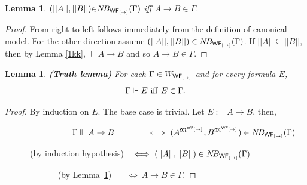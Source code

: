 \documentclass[12pt]{article}
\newtheorem{lem}[thm]{Lemma}
\begin{document}
\begin{lem}
\label{xxxx}
$( ||  A||  , ||  B ||  ) {\in} N\!B_{{\sf WF_{[\rightarrow]}}} (\Gamma )$ iff $ A \rightarrow B \in\Gamma$.
\end{lem}
\begin{proof} From right to left follows immediately from the definition of canonical model. For the other direction assume $( || A||  ,  ||  B||   ) \in N\!B_{{\sf WF_{[\rightarrow]}}} (\Gamma )$. If $ ||  A||  \subseteq  ||  B||   $, then by Lemma \ref{1kk}, $ \vdash A\rightarrow B $ and so $ A\rightarrow B \in \Gamma  $.
\end{proof}




\begin{lem}\label{uuu}
\em\textbf{(Truth lemma)} For each $ \Gamma \in  W_{{\sf WF_{[\rightarrow]}}}$ and for every formula $  E $, $$ \Gamma\Vdash   E~{\rm iff}~ E \in \Gamma .$$
\end{lem}
\begin{proof} By induction on $E$. The base case is trivial. Let $E:=A\rightarrow B  $, then,

  ~~~~~~~~~~~~~~~~$\Gamma \Vdash  A\rightarrow B~~~~~~~~~~~~\Longleftrightarrow~ (A^{\mathfrak{M}^{{\sf WF_{[\rightarrow]}}}}, B^{\mathfrak{M}^{{\sf WF_{[\rightarrow]}}}} ) \in N\!B_{{\sf WF_{[\rightarrow]}}}(\Gamma) $

~~~~~~(by induction hypothesis) $~~\,\Longleftrightarrow~ (||A|| ,  || B||) \in N\!B_{{\sf WF_{[\rightarrow]}}}(\Gamma)~$

~~~~~~~~~~~~ (by Lemma~\ref{xxxx}) $~~~~~~\,\Longleftrightarrow~A\rightarrow B \in \Gamma .$
  \end{proof}
\end{document}
